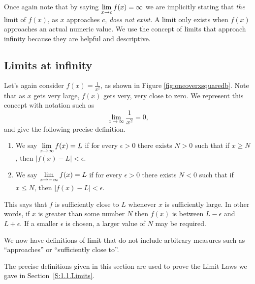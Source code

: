 Once again note that by saying $\displaystyle \lim_{x\to c}f(x) = \infty$ we are implicitly stating that \textit{the} limit of $f(x)$, as $x$ approaches $c$, \textit{does not exist.} A limit only exists when $f(x)$ approaches an actual numeric value. We use the concept of limits that approach infinity because they are helpful and descriptive. 


\subsection*{Limits at infinity}

Let's again consider $f(x) =\frac{1}{x^2}$, as shown in Figure \ref{fig:oneoverxsquaredb}. Note that as $x$ gets very large, $f(x)$ gets very, very close to zero. We represent this concept with notation such as
\[ \lim_{x \to \infty} \frac1{x^2}=0, \]
and give the following precise definition.


{\begin{enumerate}
\item We say $\displaystyle\lim_{x\rightarrow\infty} f(x)=L$ if for every $\epsilon>0$ there exists $N>0$ such that if $x\geq N$, then $|f(x)-L|<\epsilon$. 

\item We say $\displaystyle\lim_{x\rightarrow-\infty} f(x)=L$ if for every $\epsilon>0$ there exists $N<0$ such that if $x\leq N$, then $|f(x)-L|<\epsilon$.
\end{enumerate}
}

This says that $f$ is sufficiently close to $L$ whenever $x$ is sufficiently large. In other words, if $x$ is greater than some number $N$ then $f(x)$ is between $L-\epsilon$ and $L+\epsilon$. If a smaller $\epsilon$ is chosen, a larger value of $N$ may be required. 


\vspace{2cm}

\begin{summary}
\item We now have definitions of limit that do not include arbitrary measures such as ``approaches'' or ``sufficiently close to''.

 \item The precise definitions given in this section are used to prove the Limit Laws we gave in Section~\ref{S:1.1.Limits}.
\end{summary}

\clearpage

 

\cleardoublepage
